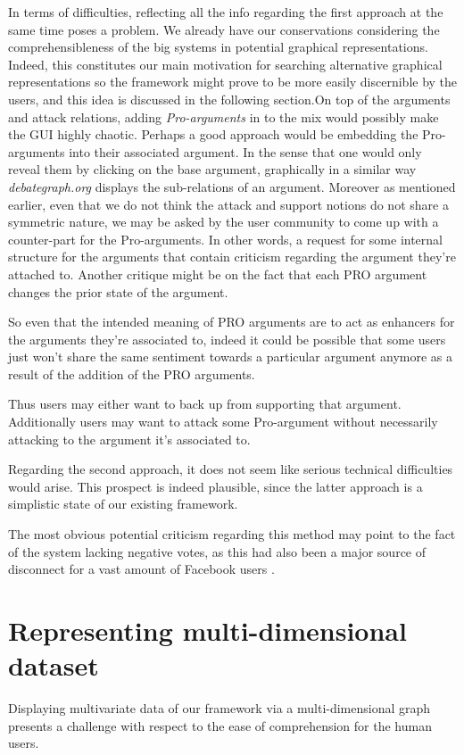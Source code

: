 \documentclass{article}
\begin{document}
{\color{red} 

In terms of difficulties,  reflecting all the info regarding the first approach at the same time poses a problem. We already have our conservations considering the comprehensibleness of the big systems in potential graphical representations. Indeed, this constitutes our main motivation for searching alternative graphical representations so the framework might prove to be more easily discernible by the users, and this idea is discussed in the following section.On top of the arguments and attack relations, adding \textit{Pro-arguments} in to the mix would possibly  make the GUI highly chaotic. Perhaps a good approach would be embedding the Pro-arguments into their associated argument. In the sense that one would only reveal them by clicking on the base argument, graphically in a similar way \textit{debategraph.org} displays the sub-relations of an argument. Moreover as mentioned earlier, even that we do not think the attack and support notions do not share a symmetric nature,  we may be asked by the user community to come up with a counter-part for the Pro-arguments.  In other words, a request for some internal structure for the arguments that contain criticism regarding the argument they're attached to. Another critique might be on the fact that each PRO argument changes the prior state of the argument.}
So even that the intended meaning of PRO arguments are to act as enhancers for the arguments they're associated to, indeed it could be possible that some users just won't share the same sentiment towards a particular argument anymore as a result of the addition of the PRO arguments. {\color{red} Thus users may either want to back up from supporting that argument. Additionally users may want to attack some Pro-argument without necessarily attacking to the argument it's associated to.

Regarding the second approach, it does not seem like serious technical difficulties would arise. This prospect is indeed plausible, since the latter approach is a simplistic state of our existing framework.} 
The most obvious potential criticism regarding this method  may point to the fact of the system lacking negative votes, as this had also been a major source of disconnect for a vast amount of Facebook users \cite{FBdislike}.


\section{Representing multi-dimensional dataset} 
Displaying multivariate data of our framework via a multi-dimensional graph presents a challenge with respect to the ease of comprehension for the human users.
\end{document}
